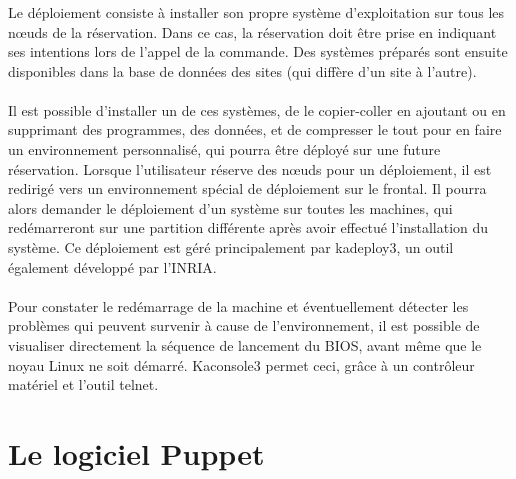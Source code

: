 \documentclass[a4paper, 10pt, onecolumn]{report}
\begin{document}
\subsection{}
Le déploiement consiste à installer son propre système d’exploitation sur tous les nœuds de la réservation. Dans ce cas, la réservation doit 
être prise en indiquant ses intentions lors de l’appel de la commande. Des systèmes préparés sont ensuite disponibles dans la base de données 
des sites (qui diffère d’un site à l’autre). \\
\\
Il est possible d’installer un de ces systèmes, de le copier-coller en ajoutant ou en supprimant des programmes, 
des données, et de compresser le tout pour en faire un environnement personnalisé, qui pourra être déployé sur une future réservation. Lorsque 
l’utilisateur réserve des nœuds pour un déploiement, il est redirigé vers un environnement spécial de déploiement sur le frontal. Il pourra alors 
demander le déploiement d’un système sur toutes les machines, qui redémarreront sur une partition différente après avoir effectué l’installation 
du système. Ce déploiement est géré principalement par kadeploy3, un outil également développé par l’INRIA.\\
\\
Pour constater le redémarrage de la machine et éventuellement détecter les problèmes qui peuvent survenir à cause de l’environnement, il est 
possible de visualiser directement la séquence de lancement du BIOS, avant même que le noyau Linux ne soit démarré. Kaconsole3 permet ceci, grâce à un 
contrôleur matériel et l’outil telnet.

\chapter{Le logiciel Puppet}
\end{document}
